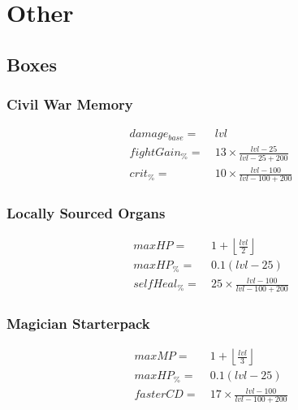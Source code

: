 \chapter{Other}
\section{Boxes}
    \begin{center}
    \end{center}
    \subsection{Civil War Memory}

        \begin{align*}
            damage_{base} = &\  lvl
            \\
            fightGain_\% = &\   13 \times \frac{{lvl}-25}{{lvl}-25+200}
            \\
            crit_\% = &\  10 \times \frac{{lvl}-100}{{lvl}-100+200}
        \end{align*}

    \subsection{Locally Sourced Organs}

        \begin{align*}
            maxHP = &\  1 + \left\lfloor \frac{lvl}{2} \right\rfloor 
            \\
            maxHP_\%  = &\   0.1(lvl-25)
            \\
            selfHeal_\% = &\  25 \times \frac{lvl-100}{lvl-100+200}
        \end{align*}

    \subsection{Magician Starterpack}
        \begin{align*}
            maxMP = &\  1 + \left\lfloor \frac{lvl}{3} \right\rfloor 
            \\
            maxHP_\% = &\   0.1(lvl-25)
            \\
            fasterCD = &\  17 \times \frac{{lvl}-100}{{lvl}-100+200}
        \end{align*}

